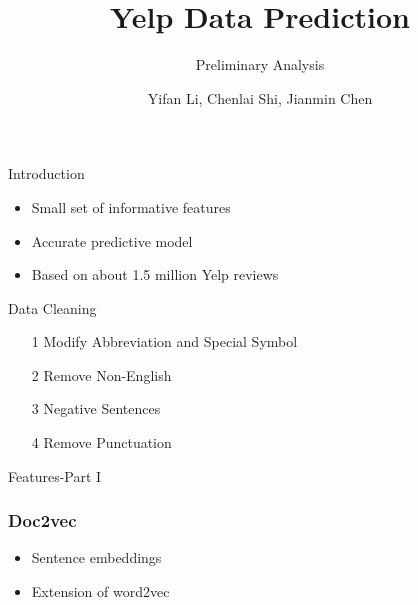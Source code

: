 \documentclass[10pt]{beamer}
\title{Yelp Data Prediction}
\subtitle{Preliminary Analysis}
\date{}
\author{Yifan Li, Chenlai Shi, Jianmin Chen}
\institute{Monday Group 1}
\begin{document}
\maketitle



\begin{frame}{Introduction}
\begin{itemize}
	\item Small set of informative features
	\item Accurate predictive model
	\item Based on about 1.5 million Yelp reviews
\end{itemize}
\end{frame}



\begin{frame}{Data Cleaning}


\begin{itemize}

	\item[1] Modify Abbreviation and Special Symbol

	\item[2] Remove Non-English

	\item[3] Negative Sentences
	
	\item[4] Remove Punctuation

\end{itemize}

\end{frame}



\begin{frame}{Features-Part I}
\frametitle{Doc2vec}
\begin{itemize}
	\item Sentence embeddings
	\item Extension of word2vec
\end{itemize}
\end{frame}
\end{document}
